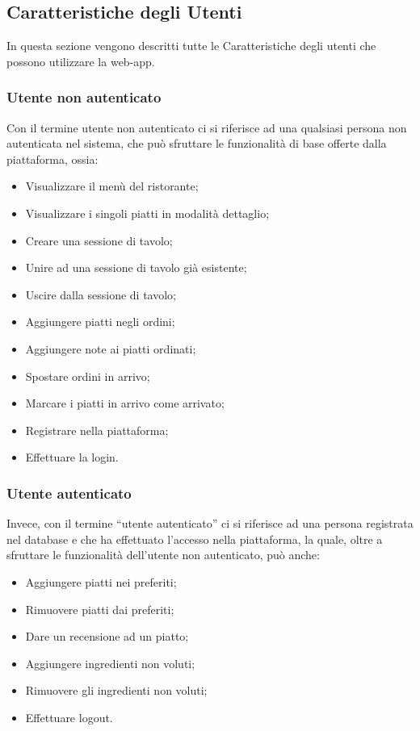 \subsection{Caratteristiche degli Utenti}
In questa sezione vengono descritti tutte le Caratteristiche degli utenti che possono utilizzare la web-app.
\subsubsection{Utente non autenticato}
Con il termine utente non autenticato ci si riferisce ad una qualsiasi persona non autenticata nel sistema, che può sfruttare le funzionalità di base offerte dalla piattaforma, ossia:
\begin{itemize}
    \item Visualizzare il menù del ristorante;
    \item Visualizzare i singoli piatti in modalità dettaglio;
    \item Creare una sessione di tavolo;
    \item Unire ad una sessione di tavolo già esistente;
    \item Uscire dalla sessione di tavolo;
    \item Aggiungere piatti negli ordini;
    \item Aggiungere note ai piatti ordinati;
    \item Spostare ordini in arrivo;
    \item Marcare i piatti in arrivo come arrivato;
    \item Registrare nella piattaforma;
    \item Effettuare la login.
\end{itemize}
\subsubsection{Utente autenticato}
Invece, con il termine “utente autenticato” ci si riferisce ad una persona registrata nel database e che ha effettuato l'accesso nella piattaforma, la quale, oltre a sfruttare le funzionalità dell'utente non autenticato, può anche:
\begin{itemize}
    \item Aggiungere piatti nei preferiti;
    \item Rimuovere piatti dai preferiti;
    \item Dare un recensione ad un piatto;
    \item Aggiungere ingredienti non voluti;
    \item Rimuovere gli ingredienti non voluti;
    \item Effettuare logout.
\end{itemize}

